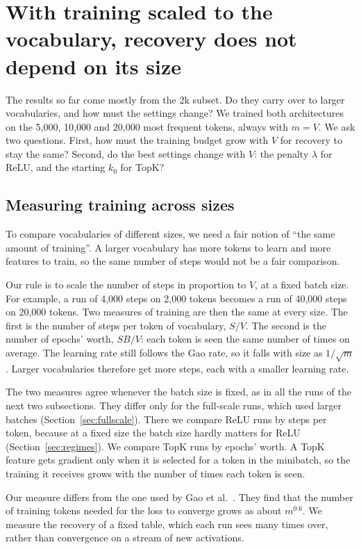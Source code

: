 \documentclass[11pt]{article}
\begin{document}
\section{With training scaled to the vocabulary, recovery does not depend on its size}
\label{sec:sizes}

The results so far come mostly from the 2k subset. Do they carry over to larger vocabularies, and how must the settings change? We trained both architectures on the 5,000, 10,000 and 20,000 most frequent tokens, always with $m = V$. We ask two questions. First, how must the training budget grow with $V$ for recovery to stay the same? Second, do the best settings change with $V$: the penalty $\lambda$ for ReLU, and the starting $k_0$ for TopK?

\subsection{Measuring training across sizes}

To compare vocabularies of different sizes, we need a fair notion of ``the same amount of training''. A larger vocabulary has more tokens to learn and more features to train, so the same number of steps would not be a fair comparison.

Our rule is to scale the number of steps in proportion to $V$, at a fixed batch size. For example, a run of 4,000 steps on 2,000 tokens becomes a run of 40,000 steps on 20,000 tokens. Two measures of training are then the same at every size. The first is the number of steps per token of vocabulary, $S/V$. The second is the number of epochs' worth, $SB/V$: each token is seen the same number of times on average. The learning rate still follows the Gao rate, so it falls with size as $1/\sqrt{m}$. Larger vocabularies therefore get more steps, each with a smaller learning rate.

The two measures agree whenever the batch size is fixed, as in all the runs of the next two subsections. They differ only for the full-scale runs, which used larger batches (Section~\ref{sec:fullscale}). There we compare ReLU runs by steps per token, because at a fixed size the batch size hardly matters for ReLU (Section~\ref{sec:regimes}). We compare TopK runs by epochs' worth. A TopK feature gets gradient only when it is selected for a token in the minibatch, so the training it receives grows with the number of times each token is seen.

Our measure differs from the one used by Gao et al.~\cite{gao2024scaling}. They find that the number of training tokens needed for the loss to converge grows as about $m^{0.6}$. We measure the recovery of a fixed table, which each run sees many times over, rather than convergence on a stream of new activations.
\end{document}
